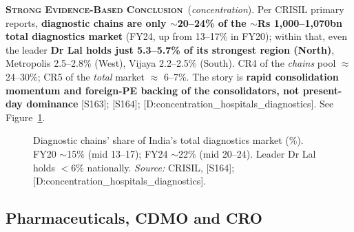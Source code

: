 \documentclass[11pt,a4paper]{article}
\newcommand{\SE}{\textcolor{secol}{\textsc{\textbf{Strong Evidence-Based Conclusion}}}}
\newcommand{\cs}[1]{\textnormal{[#1]}}
\begin{document}
\SE\ (\emph{concentration}). Per CRISIL primary reports, \textbf{diagnostic chains are only $\sim$20--24\% of the $\sim$Rs 1{,}000--1{,}070bn total diagnostics market} (FY24, up from 13--17\% in FY20); within that, even the leader \textbf{Dr Lal holds just 5.3--5.7\% of its strongest region (North)}, Metropolis 2.5--2.8\% (West), Vijaya 2.2--2.5\% (South). CR4 of the \emph{chains} pool $\approx$ 24--30\%; CR5 of the \emph{total} market $\approx$ 6--7\%. The story is \textbf{rapid consolidation momentum and foreign-PE backing of the consolidators, not present-day dominance} \cs{S163}; \cs{S164}; \cs{D:concentration\_hospitals\_diagnostics}. See Figure~\ref{fig:ch10diag}.

\begin{figure}[htbp]
\centering
{}
\caption{Diagnostic chains' share of India's total diagnostics market (\%). FY20 $\sim$15\% (mid 13--17); FY24 $\sim$22\% (mid 20--24). Leader Dr Lal holds $<$6\% nationally. \textit{Source:} CRISIL, \cs{S164}; \cs{D:concentration\_hospitals\_diagnostics}.}
\label{fig:ch10diag}
\end{figure}

\subsection{Pharmaceuticals, CDMO and CRO}
\end{document}
